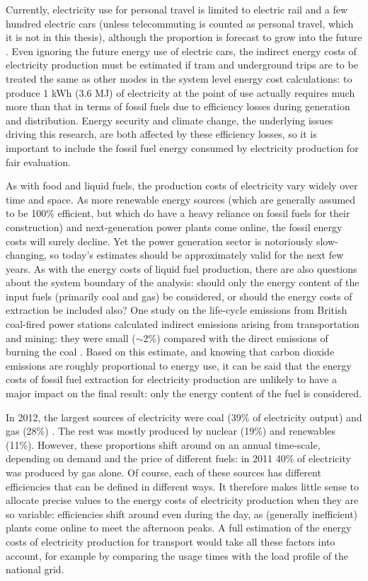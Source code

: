 \documentclass[a4paper, 11pt, twoside]{Thesis}
\begin{document}
Currently, electricity use for personal travel is limited to electric
rail and a few hundred electric cars (unless telecommuting is counted as
personal travel, which it is not in this thesis),
although the proportion is forecast to grow into the future \citep{Skea2010}.
Even ignoring the future energy use of electric cars, the indirect energy costs
of electricity production must be estimated if 
tram and underground trips are to be treated the same as other modes in the
system level energy cost calculations: to produce 1 kWh (3.6 MJ) of electricity
at the point of use actually requires much more than that in terms of fossil
fuels due to efficiency losses during generation and distribution. Energy
security and climate change, the underlying issues driving this research, are
both affected by these efficiency losses, so it is important to include the
fossil fuel energy consumed by electricity production for fair evaluation.

As with food and liquid fuels, the production costs of electricity vary widely
over time and space. As more renewable energy sources (which are generally
assumed to be 100\% efficient, but which do have a heavy reliance on fossil
fuels for their construction) and next-generation power plants come online,
the fossil energy costs will surely decline. Yet the power generation sector is
notoriously slow-changing, so today's estimates should be approximately valid
for the next few years. As with the energy costs of liquid fuel production,
there are also questions about the system boundary of the analysis: should only
the energy content of the input fuels (primarily coal and gas) be considered,
or should the energy costs of extraction be included also? One study on the
life-cycle emissions from British coal-fired power stations calculated indirect
emissions arising from transportation and mining: they were small ($\sim$2\%)
compared with the direct emissions of burning the coal \citep{Odeh2008212}.
Based on this estimate, and knowing that carbon dioxide emissions are roughly
proportional to energy use, it can be said that the energy costs of fossil fuel
extraction for electricity production are unlikely to have a major impact on
the final result: only the energy content of the fuel is considered.

In 2012, the largest sources of electricity were coal (39\% of electricity
output) and gas (28\%) \citep{Decc2013-elec}. The rest was mostly produced by
nuclear (19\%) and renewables (11\%). However, these proportions shift around
on an annual time-scale, depending on demand and the price of different fuels:
in 2011 40\% of electricity was produced by gas alone. Of course, each of
these sources has different efficiencies that can be defined in different ways.
It therefore makes little sense to allocate precise values to the energy costs
of electricity production when they are so variable: efficiencies shift around
even during the day, as (generally inefficient) plants come
online to meet the afternoon peaks. A full estimation of the energy costs of
electricity production for transport would take all these factors into account,
for example by comparing the usage times with the load profile of the national
grid.
\end{document}
